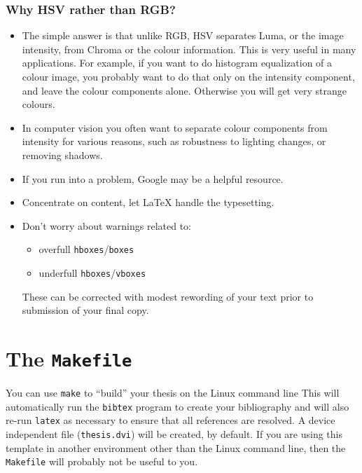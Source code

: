 \subsubsection{Why HSV rather than RGB?}


\begin{itemize}
	\item The simple answer is that unlike RGB, HSV separates Luma, or the image intensity, from Chroma or the colour information. This is very useful in many applications. For example, if you want to do histogram equalization of a colour image, you probably want to do that only on the intensity component, and leave the colour components alone. Otherwise you will get very strange colours.
	\item In computer vision you often want to separate colour components from intensity for various reasons, such as robustness to lighting changes, or removing shadows.
	\item If you run into a problem, Google may be a helpful resource.
	\item Concentrate on content, let \LaTeX{} handle the typesetting.
	\item Don't worry about warnings related to:
	\begin{itemize}
		\item overfull \texttt{hboxes}/\texttt{boxes}
		\item underfull \texttt{hboxes}/\texttt{vboxes}
	\end{itemize}
	These can be corrected with modest rewording of your text prior
	to submission of your final copy.
\end{itemize}

\section{The \texttt{Makefile}}

You can use \texttt{make} to ``build'' your thesis on the Linux command
line This will
automatically run the \texttt{bibtex} program to create your bibliography
and will also re-run \texttt{latex} as necessary to ensure that all
references are resolved.  A device independent file (\texttt{thesis.dvi})
will be created, by default.  If you are using this template in another
environment other than the Linux command line, then the \texttt{Makefile}
will probably not be useful to you.

